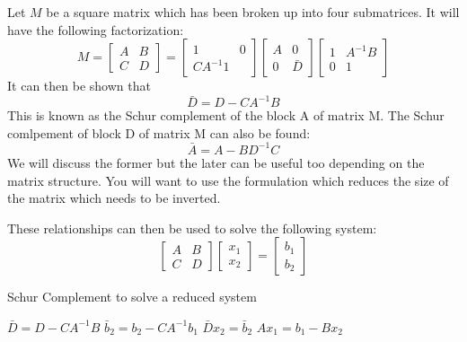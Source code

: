 \documentclass[peerreview,compsoc,onecolumn]{IEEEtran}
\begin{document}
Let $M$ be a square matrix which has been broken up into four submatrices. It will have the following factorization:
\begin{equation}
M = \begin{bmatrix}
A & B \\
C & D
\end{bmatrix}
=
\begin{bmatrix}
1 & 0 \\
C A^{-1} 1
\end{bmatrix}
\begin{bmatrix}
A & 0 \\
0 & \bar{D}
\end{bmatrix}
\begin{bmatrix}
1 & A^{-1}B \\
0 & 1
\end{bmatrix}
\end{equation}
It can then be shown that
\begin{equation}
\bar{D} = D - C A^{-1}B
\end{equation}
This is known as the Schur complement of the block A of matrix M. The Schur comlpement of block D of matrix M can also be found:
\begin{equation}
\bar{A} = A - B D^{-1}C
\end{equation}
We will discuss the former but the later can be useful too depending on the matrix structure. You will want to use the formulation which reduces the size of the matrix which needs to be inverted.

These relationships can then be used to solve the following system:
\begin{equation}
\begin{bmatrix}
A & B \\
C & D
\end{bmatrix}
\begin{bmatrix}
x_1 \\ x_2
\end{bmatrix}
=
\begin{bmatrix}
b_1 \\ b_2
\end{bmatrix}
\end{equation}

\begin{algorithm}{}
\caption{\label{alg:schur_complement}Schur Complement to solve a reduced system}
\begin{algorithmic}[1]
	\State $\bar{D} = D - C A^{-1} B$
	\State $\bar{b}_2 = b_2 - C A^{-1} b_1$  
	\State $\bar{D} x_2 = \bar{b}_2$         
	\State $A x_1 = b_1 - B x_2$
\end{algorithmic}
\end{algorithm}
\end{document}
